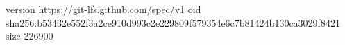 version https://git-lfs.github.com/spec/v1
oid sha256:b53432e552f3a2ce910d993c2e229809f579354e6c7b81424b130ca3029f8421
size 226900
